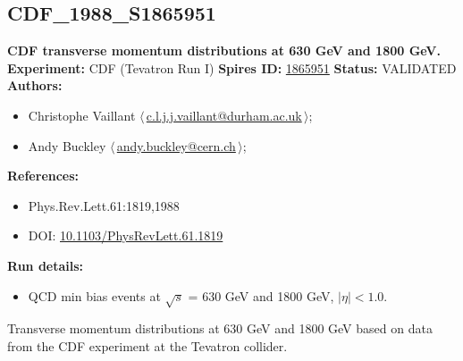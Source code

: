 \subsection[CDF\_1988\_S1865951]{CDF\_1988\_S1865951\,\cite{Abe:1988yu}}
\textbf{CDF transverse momentum distributions at 630 GeV and 1800 GeV.}\newline
\textbf{Experiment:} CDF (Tevatron Run I) \newline
\textbf{Spires ID:} \href{http://www.slac.stanford.edu/spires/find/hep/www?rawcmd=key+1865951}{1865951}\newline
\textbf{Status:} VALIDATED\newline
\textbf{Authors:}
\begin{itemize}
  \item Christophe Vaillant $\langle\,$\href{mailto:c.l.j.j.vaillant@durham.ac.uk}{c.l.j.j.vaillant@durham.ac.uk}$\,\rangle$;
  \item Andy Buckley $\langle\,$\href{mailto:andy.buckley@cern.ch}{andy.buckley@cern.ch}$\,\rangle$;
\end{itemize}
\textbf{References:}
\begin{itemize}
  \item Phys.Rev.Lett.61:1819,1988
  \item DOI: \href{http://dx.doi.org/10.1103/PhysRevLett.61.1819}{10.1103/PhysRevLett.61.1819}
\end{itemize}
\textbf{Run details:}
\begin{itemize}

  \item QCD min bias events at \ensuremath{\sqrt{s}} = 630 GeV and 1800 GeV, $|\eta| < 1.0$.\end{itemize}

\noindent Transverse momentum distributions at 630 GeV and 1800 GeV based on data from the CDF experiment at the Tevatron collider.

\clearpage


\clearpage

